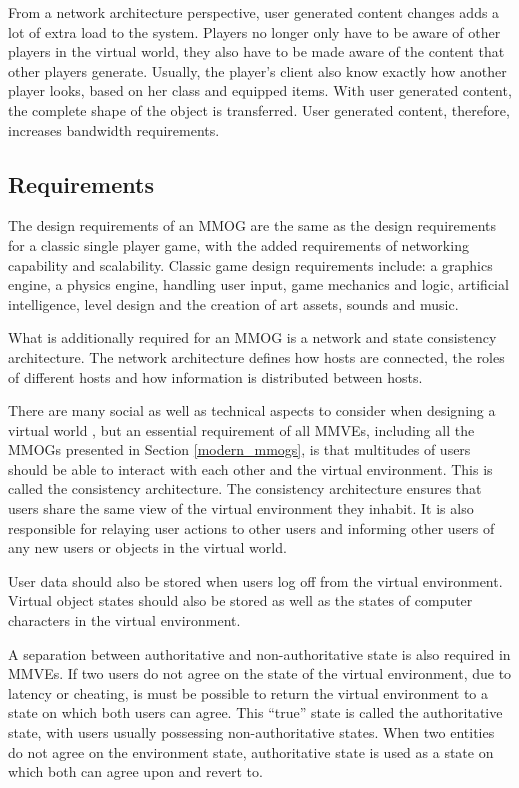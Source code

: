 From a network architecture perspective, user generated content changes adds a lot of extra load to the system. Players no longer only have to be aware of other players in the virtual world, they also have to be made aware of the content that other players generate. Usually, the player's client also know exactly how another player looks, based on her class and equipped items. With user generated content, the complete shape of the object is transferred. User generated content, therefore, increases bandwidth requirements.

\subsection{Requirements}
\label{mmve_requirements}

The design requirements of an MMOG are the same as the design requirements for a classic single player game, with the added requirements of networking capability and scalability. Classic game design requirements include: a graphics engine, a physics engine, handling user input, game mechanics and logic, artificial intelligence, level design and the creation of art assets, sounds and music.

What is additionally required for an MMOG is a network and state consistency architecture. The network architecture defines how hosts are connected, the roles of different hosts and how information is distributed between hosts.

There are many social as well as technical aspects to consider when designing a virtual world \cite{designing_virtual_worlds}, but an essential requirement of all MMVEs, including all the MMOGs presented in Section \ref{modern_mmogs}, is that multitudes of users should be able to interact with each other and the virtual environment. This is called the consistency architecture. The consistency architecture ensures that users share the same view of the virtual environment they inhabit. It is also responsible for relaying user actions to other users and informing other users of any new users or objects in the virtual world.

User data should also be stored when users log off from the virtual environment. Virtual object states should also be stored as well as the states of computer characters in the virtual environment.

A separation between authoritative and non-authoritative state is also required in MMVEs. If two users do not agree on the state of the virtual environment, due to latency or cheating, is must be possible to return the virtual environment to a state on which both users can agree. This ``true'' state is called the authoritative state, with users usually possessing non-authoritative states. When two entities do not agree on the environment state, authoritative state is used as a state on which both can agree upon and revert to.

